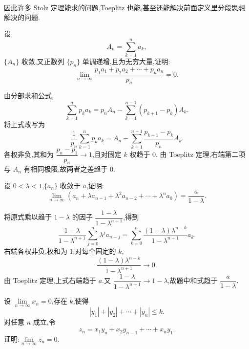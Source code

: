 \begin{remark}
  因此许多 Stolz 定理能求的问题,Toeplitz 也能,甚至还能解决前面定义里分段思想解决的问题.
\end{remark}

\begin{example}
  设
  \[
    A_n=\sum\limits_{k=1}^n a_k,
  \]
  $\{A_n\}$ 收敛,又正数列 $\{p_n\}$ 单调递增,且为无穷大量,证明:
  \[
    \displaystyle\lim\limits_{n\to\infty}
    \dfrac{p_1a_1+p_2a_2+\cdots+p_na_n}{p_n}=0.
  \]
\end{example}
\exampleblank

\begin{solution}
  由分部求和公式,
  \[
    \displaystyle\sum\limits_{k=1}^n p_ka_k
    =p_nA_n-\sum\limits_{k=1}^{n-1}(p_{k+1}-p_k)A_k.
  \]
  将上式改写为
  \[
    \dfrac{1}{p_n}\sum\limits_{k=1}^n p_ka_k
    =A_n-\sum\limits_{k=1}^{n-1}
    \dfrac{p_{k+1}-p_k}{p_n}A_k.
  \]
  各权非负,其和为 $\dfrac{p_n-p_1}{p_n}\to1$,且对固定 $k$ 权趋于 $0$.
  由 Toeplitz 定理,右端第二项与 $A_n$ 有相同极限,故两者之差趋于 $0$.
\end{solution}

\begin{example}
  设 $0<\lambda<1$,$\{a_n\}$ 收敛于 $a$,证明:
  \[
    \displaystyle\lim\limits_{n\to\infty}
    \left(a_n+\lambda a_{n-1}+\lambda^2a_{n-2}+\cdots+\lambda^n a_0\right)
    =\dfrac{a}{1-\lambda}.
  \]
\end{example}
\exampleblank

\begin{solution}
  将原式乘以趋于 $1-\lambda$ 的因子
  $\dfrac{1-\lambda}{1-\lambda^{n+1}}$,得到
  \[
    \dfrac{1-\lambda}{1-\lambda^{n+1}}
    \sum\limits_{j=0}^n\lambda^j a_{n-j}
    =\sum\limits_{k=0}^n
    \dfrac{(1-\lambda)\lambda^{n-k}}{1-\lambda^{n+1}}a_k.
  \]
  右端各权非负,权和为 $1$;对每个固定的 $k$,
  \[
    \dfrac{(1-\lambda)\lambda^{n-k}}{1-\lambda^{n+1}}
    \longrightarrow0.
  \]
  由 Toeplitz 定理,上式右端趋于 $a$.又
  $\dfrac{1-\lambda}{1-\lambda^{n+1}}\to1-\lambda$,故题中和式趋于
  $\dfrac{a}{1-\lambda}$.
\end{solution}

\begin{example}
  设 $\displaystyle \lim\limits_{n\to\infty}x_n=0$,存在 $k$,使得
  \[
    |y_1|+|y_2|+\cdots+|y_n|\leq k.
  \]
  对任意 $n$ 成立,令
  \[
    z_n=x_1y_n+x_2y_{n-1}+\cdots+x_ny_1.
  \]
  证明:$\displaystyle \lim\limits_{n\to\infty}z_n=0$.
\end{example}
\exampleblank

